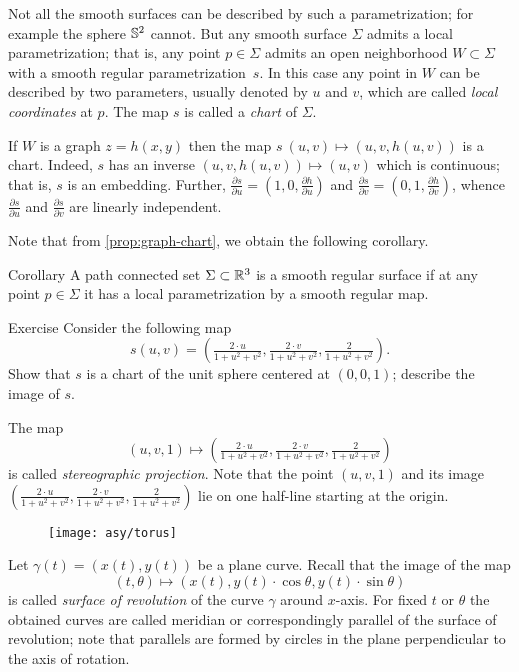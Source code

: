Not all the smooth surfaces can be described by such a parametrization;
for example the sphere $\mathbb{S}^2$ cannot.
But any smooth surface $\Sigma$ admits a local parametrization; that is, any point $p\in\Sigma$ admits an open neighborhood $W\subset \Sigma$ with a smooth regular parametrization~$s$.
In this case any point in $W$ can be described by two parameters, usually denoted by $u$ and $v$, 
which are called \emph{local coordinates} at $p$.
The map $s$ is called a \emph{chart} of $\Sigma$.

If $W$ is a graph $z=h(x,y)$ then the map $s\:(u,v)\mapsto (u,v,h(u,v))$ is a chart.
Indeed, $s$ has an inverse $(u,v,h(u,v))\mapsto (u,v)$ which is continuous;
that is, $s$ is an embedding.
Further,
$\tfrac{\partial s}{\partial u}=(1,0,\tfrac{\partial h}{\partial u})$ and $\tfrac{\partial s}{\partial v}=(0,1,\tfrac{\partial h}{\partial v})$, whence $\tfrac{\partial s}{\partial u}$ and $\tfrac{\partial s}{\partial v}$ are linearly independent.

Note that from \ref{prop:graph-chart}, we obtain the following corollary.

\begin{thm}{Corollary}
A path connected set $\Sigma\subset \mathbb{R}^3$ is a smooth regular surface if at any point $p\in \Sigma$ it has a local parametrization by a smooth regular map.
\end{thm}


\begin{thm}{Exercise}\label{ex:inversion}
Consider the following map 
\[s(u,v)=(\tfrac{2\cdot u}{1+u^2+v^2},\tfrac{2\cdot v}{1+u^2+v^2},\tfrac{2}{1+u^2+v^2}).\]
Show that $s$ is a chart of the unit sphere centered at $(0,0,1)$; describe the image of $s$.
\end{thm}

The map 
\[(u,v,1)\mapsto (\tfrac{2\cdot u}{1+u^2+v^2},\tfrac{2\cdot v}{1+u^2+v^2},\tfrac{2}{1+u^2+v^2})\]
is called \emph{stereographic projection}. 
Note that the point $(u,v,1)$ and its image $(\tfrac{2\cdot u}{1+u^2+v^2},\tfrac{2\cdot v}{1+u^2+v^2},\tfrac{2}{1+u^2+v^2})$ lie on one half-line starting at the origin.

\begin{wrapfigure}{r}{40 mm}
\vskip-4mm
\centering
\texttt{[image: asy/torus]}
\vskip-3mm
\end{wrapfigure}

Let $\gamma(t)=(x(t),y(t))$ be a plane curve.
Recall that the image of the map 
\[(t,\theta)\mapsto (x(t), y(t)\cdot\cos\theta,y(t)\cdot\sin\theta)\] 
is called \emph{surface of revolution} of the curve $\gamma$ around $x$-axis.
For fixed $t$ or $\theta$ the obtained curves are called meridian or correspondingly parallel of the surface of revolution; note that parallels are formed by circles in the plane perpendicular to the axis of rotation.

